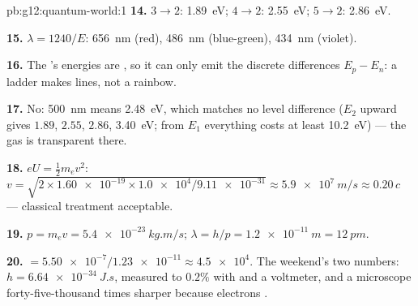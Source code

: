\begin{solution}{pb:g12:quantum-world:1}
\textbf{14.} $3 \to 2$: \qty{1.89}{eV}; $4 \to 2$: \qty{2.55}{eV};
$5 \to 2$: \qty{2.86}{eV}.

\textbf{15.} $\lambda = 1240/E$: \qty{656}{nm} (red), \qty{486}{nm}
(blue-green), \qty{434}{nm} (violet).

\textbf{16.} The 's energies are , so it can only emit
the discrete differences $E_p - E_n$: a ladder makes lines, not a
rainbow.

\textbf{17.} No: \qty{500}{nm} means \qty{2.48}{eV}, which matches no
level difference ($E_2$ upward gives $1.89$, $2.55$, $2.86$,
\qty{3.40}{eV}; from $E_1$ everything costs at least \qty{10.2}{eV})
--- the gas is transparent there.

\textbf{18.} $eU = \tfrac12 m_e v^2$: $v = \sqrt{2 \times
\num{1.60e-19} \times \num{1.0e4}/\num{9.11e-31}} \approx
\qty{5.9e7}{m/s} \approx 0.20\,c$ --- classical treatment acceptable.

\textbf{19.} $p = m_e v = \qty{5.4e-23}{kg.m/s}$;
$\lambda = h/p = \qty{1.2e-11}{m} = \qty{12}{pm}$.

\textbf{20.}  $= \num{5.50e-7}/\num{1.23e-11} \approx \num{4.5e4}$.
The weekend's two numbers: $h = \qty{6.64e-34}{J.s}$, measured to
$0.2\%$ with  and a voltmeter, and a microscope
forty-five-thousand times sharper because electrons .
\end{solution}
